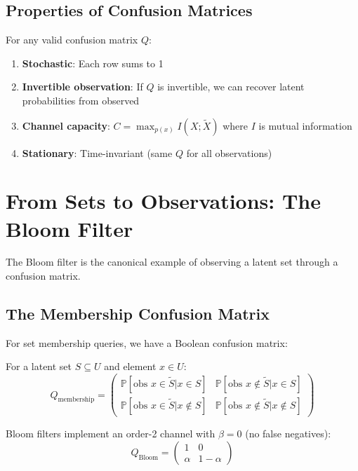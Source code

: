 \subsection{Properties of Confusion Matrices}

\begin{theorem}
For any valid confusion matrix $Q$:
\begin{enumerate}
\item \textbf{Stochastic}: Each row sums to 1
\item \textbf{Invertible observation}: If $Q$ is invertible, we can recover latent probabilities from observed
\item \textbf{Channel capacity}: $C = \max_{p(x)} I(X;\tilde{X})$ where $I$ is mutual information
\item \textbf{Stationary}: Time-invariant (same $Q$ for all observations)
\end{enumerate}
\end{theorem}

\section{From Sets to Observations: The Bloom Filter}

The Bloom filter is the canonical example of observing a latent set through a confusion matrix.

\subsection{The Membership Confusion Matrix}

For set membership queries, we have a Boolean confusion matrix:

\begin{definition}
For a latent set $S \subseteq U$ and element $x \in U$:
\begin{equation}
Q_{\text{membership}} = \begin{pmatrix}
\mathbb{P}[\text{obs } x \in \tilde{S} | x \in S] & \mathbb{P}[\text{obs } x \notin \tilde{S} | x \in S] \\
\mathbb{P}[\text{obs } x \in \tilde{S} | x \notin S] & \mathbb{P}[\text{obs } x \notin \tilde{S} | x \notin S]
\end{pmatrix}
\end{equation}
\end{definition}

Bloom filters implement an order-2 channel with $\beta = 0$ (no false negatives):
\begin{equation}
Q_{\text{Bloom}} = \begin{pmatrix}
1 & 0 \\
\alpha & 1-\alpha
\end{pmatrix}
\end{equation}

